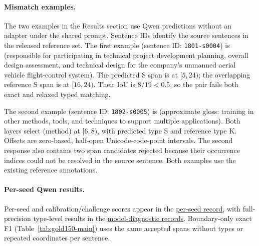 \paragraph{Mismatch examples.}
\label{sec:error-examples}
The two examples in the Results section use Qwen predictions without an adapter under the shared prompt. Sentence IDs identify the source sentences in the released reference set. The first example (sentence ID: \texttt{1801-s0004}) is  (responsible for participating in technical project development planning, overall design assessment, and technical design for the company's unmanned aerial vehicle flight-control system). The predicted S span is  at $[5,24)$; the overlapping reference S span is  at $[16,24)$. Their IoU is $8/19<0.5$, so the pair fails both exact and relaxed typed matching.

The second example (sentence ID: \texttt{1802-s0005}) is  (approximate gloss: training in other methods, tools, and techniques to support multiple applications). Both layers select  (method) at $[6,8)$, with predicted type S and reference type K. Offsets are zero-based, half-open Unicode-code-point intervals. The second response also contains two span candidates rejected because their occurrence indices could not be resolved in the source sentence. Both examples use the existing reference annotations.

\FloatBarrier
\paragraph{Per-seed Qwen results.}
\label{sec:qwen-shared-sft-r42}
Per-seed and calibration/challenge scores appear in the \href{https://github.com/AlfredJamesLi/chinese-skillspan-benchmark/blob/1d1c24e20ee049fc768034b5baf58fa882e08e2c/reproduction/process_archive_20260924/secondary_review/README.md#previous-table-17-qwen-per-seed-and-cohort-scores}{per-seed record}, with full-precision type-level results in the \href{https://github.com/AlfredJamesLi/chinese-skillspan-benchmark/tree/main/reproduction/model_diagnostics_20261003}{model-diagnostic records}. Boundary-only exact F1 (Table~\ref{tab:gold150-main}) uses the same accepted spans without types or repeated coordinates per sentence.


